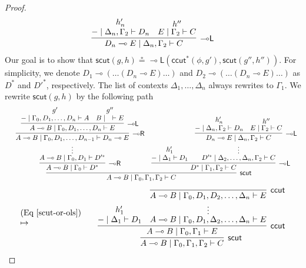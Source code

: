 \documentclass[sn-mathphys-num]{sn-jnl}%
\newcommand{\GG}{\Gamma}
\newcommand{\GD}{\Delta}
\newcommand{\vd}{\vdash}
\newcommand{\lolli}{\multimap}
\newcommand{\lleft}{{\lolli}\mathsf{L}}
\newcommand{\lright}{{\lolli}\mathsf{R}}
\newcommand{\mf}[1]{\mathsf{#1}}
\newcommand{\scut}[2]{\mf{scut} (#1 , #2)}
\newcommand{\iccut}[2]{\mf{ccut}^* (#1 , #2)}
\theoremstyle{thmstyleone}%
\theoremstyle{thmstyletwo}%
\theoremstyle{thmstylethree}%
\begin{document}
\begin{proof}
\begin{displaymath}
\begin{array}{lcc}
\begin{array}{c}
{{{          \infer[\lleft]{D_n \lolli E \mid \GD_n, \GG_2 \vd C}{
            \deduce{{-} \mid \GD_n, \GG_2 \vd D_n}{h'_n}
            &
            \deduce{E \mid \GG_2 \vd C}{h''}
          }
        }
      }
    }
    \end{array}
  \end{array}
\end{displaymath}
Our goal is to show that $\scut{g}{h} \circeq \lleft(\iccut{\phi}{g'} , \scut{g''}{h''})$.
For simplicity, we denote $D_1 \lolli (\dots (D_n \lolli E)\dots)$ and $D_2 \lolli (\dots (D_n \lolli E)\dots)$ as $D^*$ and $D'^{*}$, respectively.
The list of contexts $\GD_1, \dots, \GD_n$ always rewrites to $\GG_1$.
We rewrite $\scut{g}{h}$ by the following path
\begin{displaymath}
  \begin{array}{lr}
    &
    \infer[\mf{scut}]{A \lolli B \mid \GG_0 , \GG_1 , \GG_2 \vd C}{
      \infer[\lright]{A\lolli B \mid \GG_0 \vd D^*}{
      \deduce{A \lolli B \mid \GG_0 , D_1 \vd D'^*}{
        \deduce{\vdots}{
        \infer[\lright]{A \lolli B \mid \GG_0 , D_1, \dots ,D_{n-1} \vd D_n \lolli E}{
        \infer[\lleft]{A \lolli B \mid \GG_0 , D_1, \dots, D_n \vd E}{
          \deduce{{-} \mid \GG_0 , D_1, \dots, D_n \vd A}{g'}
          &
          \deduce{B \mid \quad \vd E}{g''}
        }
      }
      }
      }
    }
      &
      \infer[\lleft]{D^* \mid \GG_1, \GG_2 \vd C}{
      \deduce{{-} \mid \GD_1 \vd D_1}{h'_1}
      &
      \deduce{D'^{*} \mid \GD_2, \dots, \GD_n, \GG_2 \vd C}{
        \deduce{\vdots}{
          \infer[\lleft]{D_n \lolli E \mid \GD_n, \GG_2 \vd C}{
            \deduce{{-} \mid \GD_n, \GG_2 \vd D_n}{h'_n}
            &
            \deduce{E \mid \GG_2 \vd C}{h''}
          }
        }
      }
    }
    }
  \end{array}
  \end{displaymath}
  \begin{displaymath}
  \begin{array}{lr}
   \begin{array}{l}
    (\text{Eq} \ \ref{scut-or-ols})
    \\
    \mapsto
  \end{array}
  &
  \begin{array}{c}
    \infer[\mf{scut}]{A \lolli B \mid \GG_0 , \GG_1 , \GG_2 \vd C}{
    \infer[\mf{ccut}]{A \lolli B \mid \GG_0 , \GG_1 \vd E}{
      \deduce{{-} \mid \GD_1 \vd D_1}{h'_1}
      &
      \deduce{A \lolli B \mid \GG_0 , D_1 , \GD_2 , \dots , \GD_n \vd E}{
        \deduce{\vdots}{
        \infer[\mf{ccut}]{A \lolli B \mid \GG_0 , D_1, D_2 ,\dots , \GD_n \vd E}{
}}}}}
\end{array}
\end{array}
\end{displaymath}
\end{proof}
\end{document}
